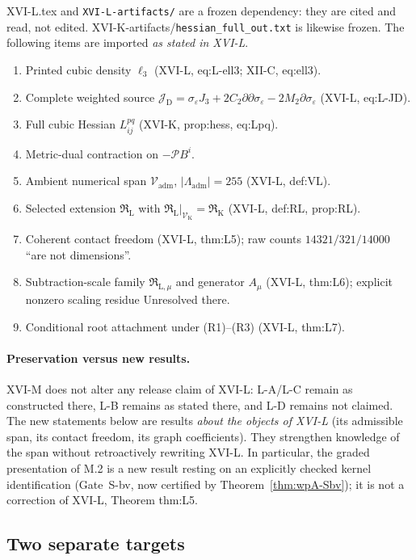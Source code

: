 \documentclass{article}
\theoremstyle{remark}
\newcommand{\RL}{\mathfrak R_{\mathrm L}}
\newcommand{\RK}{\mathfrak R_{\mathrm K}}
\newcommand{\Pc}{\mathcal P}
\newcommand{\JD}{\mathcal J_{\mathrm D}}
\newcommand{\sigeps}{\sigma_\varepsilon}
\begin{document}
XVI-L.tex and \texttt{XVI-L-artifacts/} are a frozen dependency: they are cited and read, not edited.
XVI-K-artifacts/\texttt{hessian\_full\_out.txt} is likewise frozen.
The following items are imported \emph{as stated in XVI-L}.
\begin{enumerate}
\item Printed cubic density $\ell_3$ (XVI-L, eq:L-ell3; XII-C, eq:ell3).
\item Complete weighted source $\JD=\sigeps J_3+2C_2\partial\partial\sigeps-2M_2\partial\sigeps$ (XVI-L, eq:L-JD).
\item Full cubic Hessian $L^{pq}_{ij}$ (XVI-K, prop:hess, eq:Lpq).
\item Metric-dual contraction on $-\Pc B^i$.
\item Ambient numerical span $\mathcal V_{\mathrm{adm}}$, $|\Lambda_{\mathrm{adm}}|=255$ (XVI-L, def:VL).
\item Selected extension $\RL$ with $\RL|_{\mathcal V_{\mathrm K}}=\RK$ (XVI-L, def:RL, prop:RL).
\item Coherent contact freedom (XVI-L, thm:L5); raw counts $14321/321/14000$ ``are not dimensions''.
\item Subtraction-scale family $\mathfrak R_{\mathrm L,\mu}$ and generator $A_\mu$ (XVI-L, thm:L6); explicit nonzero scaling residue Unresolved there.
\item Conditional root attachment under (R1)--(R3) (XVI-L, thm:L7).
\end{enumerate}

\paragraph{Preservation versus new results.}
XVI-M does not alter any release claim of XVI-L: L-A/L-C remain as constructed there, L-B remains as stated there, and L-D remains not claimed.
The new statements below are results \emph{about the objects of XVI-L} (its admissible span, its contact freedom, its graph coefficients).
They strengthen knowledge of the span without retroactively rewriting XVI-L.
In particular, the graded presentation of M.2 is a new result resting on an explicitly checked kernel identification (Gate~S-bv, now certified by Theorem~\ref{thm:wpA-Sbv}); it is not a correction of XVI-L, Theorem thm:L5.

\subsection{Two separate targets}
\end{document}
